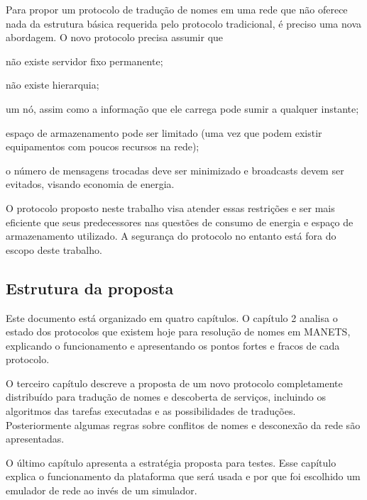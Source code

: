 Para propor um protocolo de tradução de nomes em uma rede que não oferece nada
da estrutura básica requerida pelo protocolo tradicional, é preciso uma nova
abordagem. O novo protocolo precisa assumir que
\begin{inparaenum}[(i)]
    \item não existe servidor fixo permanente;
    \item não existe hierarquia;
    \item um nó, assim como a informação que ele carrega pode sumir a qualquer
    instante;
    \item espaço de armazenamento pode ser limitado (uma vez que podem existir
    equipamentos com poucos recursos na rede);
    \item o número de mensagens trocadas deve ser minimizado e broadcasts devem
    ser evitados, visando economia de energia.
\end{inparaenum}

O protocolo proposto neste trabalho visa atender essas restrições e ser mais
eficiente que seus predecessores \cite{mcdsn} \cite{dnssd} \cite{mdns} nas questões
de consumo de energia e espaço de armazenamento utilizado. A segurança do protocolo
no entanto está fora do escopo deste trabalho.

\subsection{Estrutura da proposta}

Este documento está organizado em quatro capítulos. O capítulo 2 analisa o estado
dos protocolos que existem hoje para resolução de nomes em MANETS, explicando o
funcionamento e apresentando os pontos fortes e fracos de cada protocolo.

O terceiro capítulo descreve a proposta de um novo protocolo completamente
distribuído para tradução de nomes e descoberta de serviços, incluindo os
algoritmos das tarefas executadas e as possibilidades de traduções. Posteriormente
algumas regras sobre conflitos de nomes e desconexão da rede são apresentadas.

O último capítulo apresenta a estratégia proposta para testes. Esse capítulo
explica o funcionamento da plataforma que será usada e por que foi escolhido um
emulador de rede ao invés de um simulador.